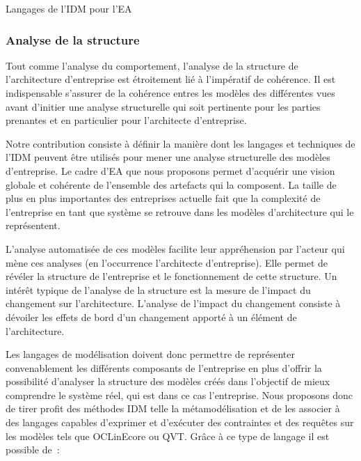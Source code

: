 \begin{table}[!ht]
    \begin{center} 
        
    \end{center}
    \caption{Langages de l'IDM pour l'EA}
    \label{fig:IDM_EA}
\end{table}

\subsubsection{Analyse de la structure} Tout comme l'analyse du comportement,
l'analyse de la structure de l'architecture d'entreprise est étroitement lié à
l'impératif de cohérence. Il est indispensable s'assurer de la cohérence
entres les modèles des différentes vues avant d'initier une analyse
structurelle qui soit pertinente pour les parties prenantes et en particulier
pour l'architecte d'entreprise.

Notre contribution consiste à définir la manière dont les langages et techniques
de l'IDM peuvent être utilisés pour mener une analyse structurelle des modèles
d'entreprise. Le cadre d'EA que nous proposons permet d'acquérir une vision
globale et cohérente de l'ensemble des artefacts qui la composent. La taille de
plus en plus importantes des entreprises actuelle fait que la complexité de
l'entreprise en tant que système se retrouve dans les modèles d'architecture qui
le représentent.

L'analyse automatisée de ces modèles facilite leur appréhension par l'acteur qui
mène ces analyses (en l'occurrence l'architecte d'entreprise). Elle permet de
révéler la structure de l'entreprise et le fonctionnement de cette structure. Un
intérêt typique de l'analyse de la structure est la mesure de l'impact du
changement \cite{de2005change} sur l'architecture. L'analyse de l'impact du
changement consiste à dévoiler les effets de bord d'un changement apporté à un
élément de l'architecture.

Les langages de modélisation doivent donc permettre de représenter
convenablement les différents composants de l'entreprise en plus d'offrir la
possibilité d'analyser la structure des modèles créés dans l'objectif de mieux
comprendre le système réel, qui est dans ce cas l'entreprise. Nous proposons
donc de tirer profit des méthodes IDM telle la métamodélisation et de les
associer à des langages capables d'exprimer et d'exécuter des contraintes et des
requêtes sur les modèles tels que OCLinEcore ou QVT. Grâce à ce type de langage
il est possible de~:

